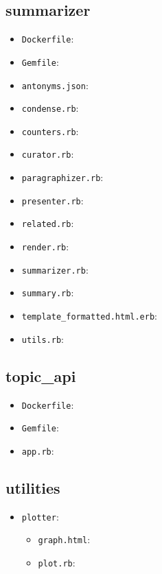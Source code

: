 \subsection*{summarizer}

\begin{itemize}

\item
  \texttt{Dockerfile}:
\item
  \texttt{Gemfile}:
\item
  \texttt{antonyms.json}:
\item
  \texttt{condense.rb}:
\item
  \texttt{counters.rb}:
\item
  \texttt{curator.rb}:
\item
  \texttt{paragraphizer.rb}:
\item
  \texttt{presenter.rb}:
\item
  \texttt{related.rb}:
\item
  \texttt{render.rb}:
\item
  \texttt{summarizer.rb}:
\item
  \texttt{summary.rb}:
\item
  \texttt{template\_formatted.html.erb}:
\item
  \texttt{utils.rb}:
\end{itemize}

\subsection*{topic\_api}

\begin{itemize}
\item
  \texttt{Dockerfile}:
\item
  \texttt{Gemfile}:
\item
  \texttt{app.rb}:
\end{itemize}

\subsection*{utilities}

\begin{itemize}

\item
  \texttt{plotter}:

  \begin{itemize}
  \item
    \texttt{graph.html}:
  \item
    \texttt{plot.rb}:
  \end{itemize}
\end{itemize}

